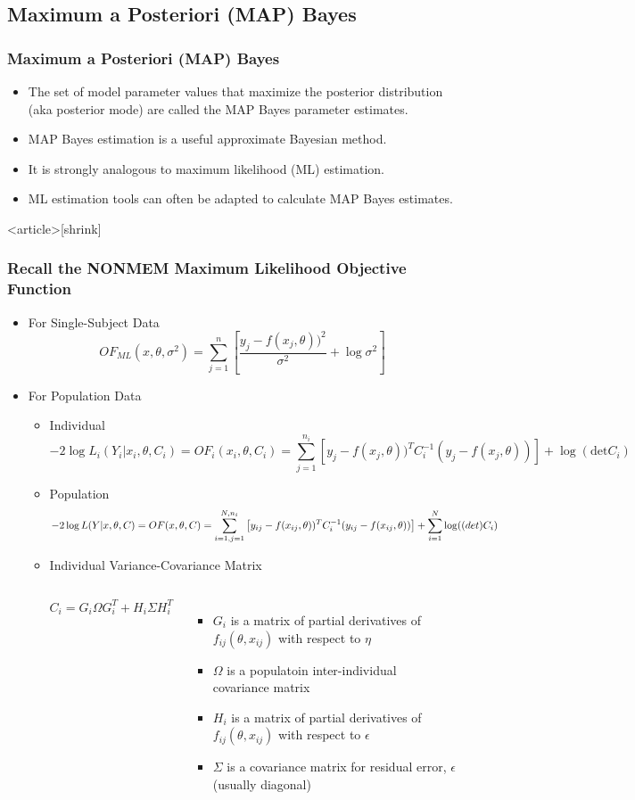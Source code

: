 \documentclass{beamer}
\begin{document}
\subsection{Maximum a Posteriori (MAP) Bayes}

\begin{frame}
  \frametitle{Maximum a Posteriori (MAP) Bayes}

  \begin{itemize}
  \item The set of model parameter values that maximize the posterior
    distribution (aka posterior mode) are called the MAP Bayes
    parameter estimates.
  \item MAP Bayes estimation is a useful approximate Bayesian method.
  \item It is strongly analogous to maximum likelihood (ML)
    estimation.
  \item ML estimation tools can often be adapted to calculate MAP
    Bayes estimates.
  \end{itemize}

\end{frame}

\begin{frame}<article>[shrink]
  \frametitle{\large Recall the NONMEM Maximum Likelihood Objective Function}

  \begin{itemize}
  \item For Single-Subject Data
$$OF_{ML}(x,\theta,\sigma^2) = \sum_{j=1}^{n}\left[\frac{y_j - f(x_j,\theta))^2}{\sigma^2} + \log\sigma^2\right]$$
\item For Population Data
  \begin{itemize}
  \item Individual
$$ -2\log L_i(Y_i|x_i,\theta,C_i) = OF_i(x_i,\theta,C_i) = \sum_{j=1}^{n_i}\left[y_j - f(x_j,\theta))^TC_i^{-1}(y_j-f(x_j,\theta))\right]+\log(\text{det}C_i)$$
\item Population
$$ -2\log L(Y|x,\theta,C) = OF(x,\theta,C) = \sum_{i=1,j=1}^{N,n_i}\left[y_{ij}-f(x_{ij},\theta))^TC_i^{-1}(y_{ij}-f(x_{ij},\theta))\right] + \sum_{i=1}^N\log(\text(det)C_i) $$
\item Individual Variance-Covariance Matrix
\begin{columns}
$$ C_i = G_i\Omega G_i^T + H_i\Sigma H_i^T$$
\begin{itemize}
\item $G_i$ is a matrix of partial derivatives of
  $f_{ij}(\theta,x_{ij})$ with respect to $\eta$
\item $\Omega$ is a populatoin inter-individual covariance matrix
\item $H_i$ is a matrix of partial derivatives of
  $f_{ij}(\theta, x_{ij})$ with respect to $\epsilon$
\item $\Sigma$ is a covariance matrix for residual error, $\epsilon$
  (usually diagonal)
\end{itemize}
\end{columns}
\end{itemize}
\end{itemize}

\end{frame}
\end{document}
